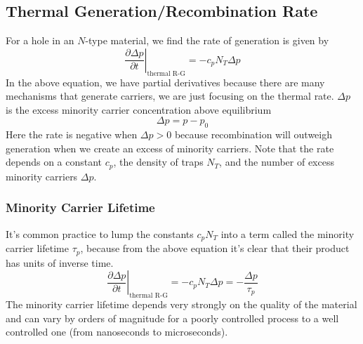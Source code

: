 \subsection{Thermal Generation/Recombination Rate}
For a hole in an $N$-type material, we find the rate of generation is given by
    \begin{equation}
        \left. \frac{\partial \Delta p}{\partial t} \right|_{\text{thermal R-G}} = - c_p N_T \Delta p
    \end{equation}
In the above equation, we have partial derivatives because there are many mechanisms that generate carriers, we are just focusing on the thermal rate.  $\Delta p$ is the excess minority carrier concentration above equilibrium
    \begin{equation}
        \Delta p = p - p_0
    \end{equation}
Here the rate is negative when $\Delta p > 0$ because recombination will outweigh generation when we create an excess of minority carriers.  Note that the rate depends on a constant $c_p$, the density of traps $N_T$, and the number of excess minority carriers $\Delta p$.  
\subsubsection*{Minority Carrier Lifetime}
It's common practice to lump the constants $c_p N_T$ into a term called the minority carrier lifetime $\tau_p$, because from the above equation it's clear that their product has units of inverse time.
    \begin{equation}
        \left. \frac{\partial \Delta p}{\partial t} \right|_{\text{thermal R-G}} = - c_p N_T \Delta p = - \frac{\Delta p}{\tau_p}
        \label{eq:lifetime}
    \end{equation} 
The minority carrier lifetime depends very strongly on the quality of the material and can vary by orders of magnitude for a poorly controlled process to a well controlled one (from nanoseconds to microseconds).
